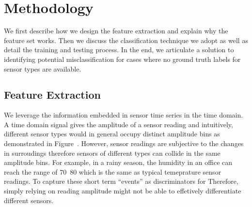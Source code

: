 
\section{Methodology}
We first describe how we design the feature extraction and explain why the feature set works. Then we discuss the classification technique we adopt as well as detail the training and testing process. In the end, we articulate a solution to identifying potential misclassification for cases where no ground truth labels for sensor types are available.

\subsection{Feature Extraction}
We leverage the information embedded in sensor time series in the time domain. A time domain signal gives the amplitude of a sensor reading and intuitively, different sensor types would in general occupy distinct amplitude bins as demonstrated in Figure~\cite{}. However, sensor readings are subjective to the changes in surroudings therefore sensors of different types can collide in the same amplitude bins. For example, in a rainy season, the humidity in an office can reach the range of 70~80 which is the same as typical temeprature sensor readings. To capture these short term ``events'' as discriminators for Therefore, simply relying on reading amplitude might not be able to effetively differentiate different sensors.


